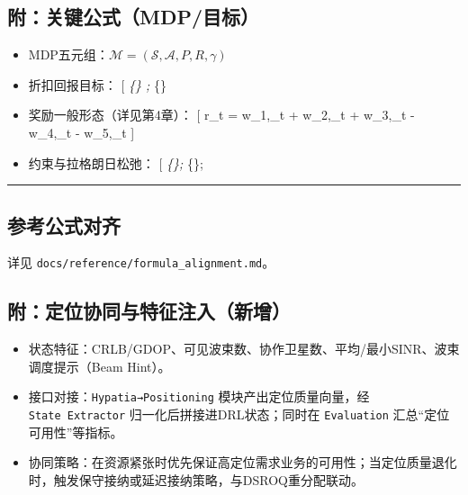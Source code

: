 \subsection{附：关键公式（MDP/目标）}\label{ux9644ux5173ux952eux516cux5f0fmdpux76eeux6807}

\begin{itemize}
\tightlist
\item
  MDP五元组：\(\mathcal{M}=(\mathcal{S},\mathcal{A},P,R,\gamma)\)
\item
  折扣回报目标： {[} \max\emph{\{\pi\} ; }\{\pi\}
  \Big[ \sum_{t=0}^{\infty} \gamma^{t} r_t \Big] {]}
\item
  奖励一般形态（详见第4章）： {[} r\_t = w\_1,\Delta{}\_t +
  w\_2,\_t + w\_3,\_t - w\_4,\_t -
  w\_5,\_t {]}
\item
  约束与拉格朗日松弛： {[} \min\emph{\{\lambda {}\}; \max}\{\pi\};
  \big[\sum_t \gamma^t (r_t - \sum_k \lambda_k g_k(s_t,a_t))\big] {]}
\end{itemize}

\begin{center}\rule{0.5\linewidth}{0.5pt}\end{center}

\subsection{参考公式对齐}\label{ux53c2ux8003ux516cux5f0fux5bf9ux9f50}

详见 \texttt{docs/reference/formula\_alignment.md}。

\subsection{附：定位协同与特征注入（新增）}\label{ux9644ux5b9aux4f4dux534fux540cux4e0eux7279ux5f81ux6ce8ux5165ux65b0ux589e}

\begin{itemize}
\tightlist
\item
  状态特征：CRLB/GDOP、可见波束数、协作卫星数、平均/最小SINR、波束调度提示（Beam
  Hint）。
\item
  接口对接：\texttt{Hypatia→Positioning} 模块产出定位质量向量，经
  \texttt{State\ Extractor} 归一化后拼接进DRL状态；同时在
  \texttt{Evaluation} 汇总``定位可用性''等指标。
\item
  协同策略：在资源紧张时优先保证高定位需求业务的可用性；当定位质量退化时，触发保守接纳或延迟接纳策略，与DSROQ重分配联动。
\end{itemize}

